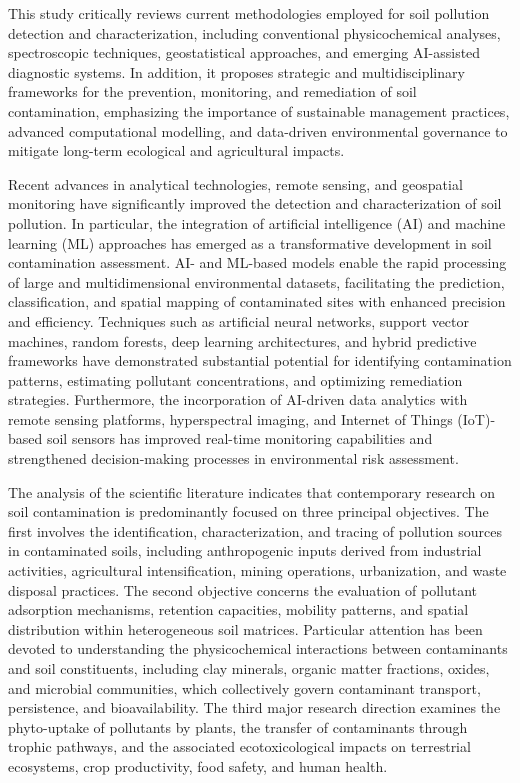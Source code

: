 \documentclass[preprint,12pt]{elsarticle}            %
\begin{document}
This study critically reviews current methodologies employed for soil pollution
detection and characterization, including conventional physicochemical
analyses, spectroscopic techniques, geostatistical approaches, and emerging
AI-assisted diagnostic systems. In addition, it proposes strategic and
multidisciplinary frameworks for the prevention, monitoring, and remediation
of soil contamination, emphasizing the importance of sustainable management
practices, advanced computational modelling, and data-driven environmental
governance to mitigate long-term ecological and agricultural impacts.

Recent advances in analytical technologies, remote sensing, and geospatial
monitoring have significantly improved the detection and characterization of
soil pollution. In particular, the integration of artificial intelligence (AI)
and machine learning (ML) approaches has emerged as a transformative
development in soil contamination assessment. AI- and ML-based models enable
the rapid processing of large and multidimensional environmental datasets,
facilitating the prediction, classification, and spatial mapping of
contaminated sites with enhanced precision and efficiency. Techniques such as
artificial neural networks, support vector machines, random forests, deep
learning architectures, and hybrid predictive frameworks have demonstrated
substantial potential for identifying contamination patterns, estimating
pollutant concentrations, and optimizing remediation strategies. Furthermore,
the incorporation of AI-driven data analytics with remote sensing platforms,
hyperspectral imaging, and Internet of Things (IoT)-based soil sensors has
improved real-time monitoring capabilities and strengthened decision-making
processes in environmental risk assessment.

The analysis of the scientific literature indicates that contemporary research
on soil contamination is predominantly focused on three principal objectives.
The first involves the identification, characterization, and tracing of
pollution sources in contaminated soils, including anthropogenic inputs derived
from industrial activities, agricultural intensification, mining operations,
urbanization, and waste disposal practices. The second objective concerns the
evaluation of pollutant adsorption mechanisms, retention capacities, mobility
patterns, and spatial distribution within heterogeneous soil matrices.
Particular attention has been devoted to understanding the physicochemical
interactions between contaminants and soil constituents, including clay
minerals, organic matter fractions, oxides, and microbial communities, which
collectively govern contaminant transport, persistence, and bioavailability.
The third major research direction examines the phyto-uptake of pollutants by
plants, the transfer of contaminants through trophic pathways, and the
associated ecotoxicological impacts on terrestrial ecosystems, crop
productivity, food safety, and human health.
\end{document}
